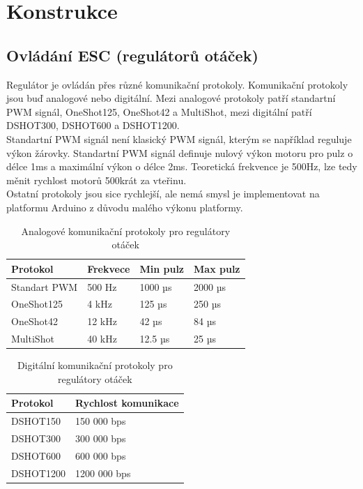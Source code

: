 \chapter{Konstrukce}
\label{4-algoritmus}

\section{Ovládání ESC (regulátorů otáček)}
Regulátor je ovládán přes různé komunikační protokoly. Komunikační protokoly jsou buď analogové nebo digitální. Mezi analogové protokoly patří standartní PWM signál, OneShot125, OneShot42 a MultiShot, mezi digitální patří  DSHOT300, DSHOT600 a DSHOT1200. \cite{comregul}\\
Standartní PWM signál není klasický PWM signál, kterým se například reguluje výkon žárovky. Standartní PWM signál definuje nulový výkon motoru pro pulz o délce 1ms a maximální výkon o délce 2ms. Teoretická frekvence je 500Hz, lze tedy měnit rychlost motorů 500krát za vteřinu.\\
Ostatní protokoly jsou sice rychlejší, ale nemá smysl je implementovat na platformu Arduino z důvodu malého výkonu platformy.\\ 

\begin{table}[H]
\centering
	\begin{tabular}{|l|l|l|l|}
		\hline
		\textbf{Protokol} & \textbf{Frekvece} & \textbf{Min pulz} & \textbf{Max pulz} \\ \hline
		Standart PWM      & 500 Hz            & 1000 µs            & 2000 µs            \\ \hline
		OneShot125        & 4 kHz             & 125 µs             & 250 µs             \\ \hline
		OneShot42         & 12 kHz            & 42 µs              & 84 µs              \\ \hline
		MultiShot         & 40 kHz            & 12.5 µs            & 25 µs              \\ \hline
	\end{tabular}
\caption{Analogové komunikační protokoly pro regulátory otáček}
\end{table}

\begin{table}[H]
	\centering
	\begin{tabular}{|l|l|}
		\hline
		\textbf{Protokol} & \textbf{Rychlost komunikace} \\ \hline
		DSHOT150          & 150 000 bps                  \\ \hline
		DSHOT300          & 300 000 bps                  \\ \hline
		DSHOT600          & 600 000 bps                  \\ \hline
		DSHOT1200         & 1200 000 bps                 \\ \hline
	\end{tabular}
\caption{Digitální komunikační protokoly pro regulátory otáček}
\end{table}

